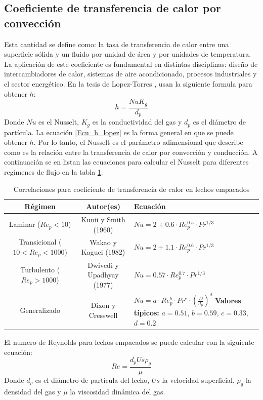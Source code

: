 \documentclass[12pt,letterpaper,final]{article}%
\begin{document}
\subsection{Coeficiente de transferencia de calor por convección}
Esta cantidad se define como: la tasa de transferencia de calor entre una superficie sólida y un fluido por unidad de área y por unidades de temperatura\cite{thermal2023conveccion}. La aplicación de este coeficiente es fundamental en distintas disciplinas: diseño de intercambiadores de calor, sistemas de aire acondicionado, procesos industriales y el sector energético.
En la tesis de Lopez-Torres \cite{Lopez2014}, usan la siguiente formula para obtener $h$:
\begin{equation}\label{Ecu_h_lopez}
	h = \frac{Nu K_g}{d_p}
\end{equation}
Donde $Nu$ es el Nusselt, $K_g$ es la conductividad del gas y $d_p$ es el diámetro de partícula.
\newline
La ecuación \ref{Ecu_h_lopez} es la forma general en que se puede obtener $h$. Por lo tanto, el Nusselt es el parámetro adimensional que describe como es la relación entre la transferencia de calor por convección y conducción. A continuación se en listan las ecuaciones para calcular el Nusselt para diferentes regímenes de flujo en la tabla \ref{tab:correlaciones_Nu}:

\begin{table}[h]
	\centering
	\caption{Correlaciones para coeficiente de transferencia de calor en lechos empacados}
	\begin{tabular}{|c|c|p{6cm}|}
		\hline
		\textbf{Régimen} & \textbf{Autor(es)} & \textbf{Ecuación} \\ \hline
		Laminar ($Re_p < 10$) & Kunii y Smith (1960) \cite{kunii1960} & $Nu = 2 + 0.6 \cdot Re_p^{0.5} \cdot Pr^{1/3}$ \\ \hline
		Transicional ($10 < Re_p < 1000$) & Wakao y Kaguei (1982)\cite{wakao1982} & $Nu = 2 + 1.1 \cdot Re_p^{0.6} \cdot Pr^{1/3}$ \\ \hline
		Turbulento ($Re_p > 1000$) & Dwivedi y Upadhyay (1977)\cite{dwivedi1977} & $Nu = 0.57 \cdot Re_p^{0.7} \cdot Pr^{1/3}$ \\ \hline
		Generalizado & Dixon y Cresswell\cite{dixon1983} & 
		$Nu = a \cdot Re_p^b \cdot Pr^c \cdot \left( \frac{D}{d_p} \right)^d$ 
		\vspace{2mm} \newline 
		\textbf{Valores típicos:} $a=0.51$, $b=0.59$, $c=0.33$, $d=0.2$ \\ \hline
	\end{tabular}
	\label{tab:correlaciones_Nu}
\end{table}
El numero de Reynolds para lechos empacados se puede calcular con la siguiente ecuación:
\begin{equation}
	Re = \frac{d_p Us \rho_g}{\mu}
\end{equation}
Donde $d_p$ es el diámetro de partícula del lecho, $Us$ la velocidad superficial, $\rho_g$ la densidad del gas y $\mu$ la viscosidad dinámica del gas.
\newpage
\printbibliography
\end{document}
